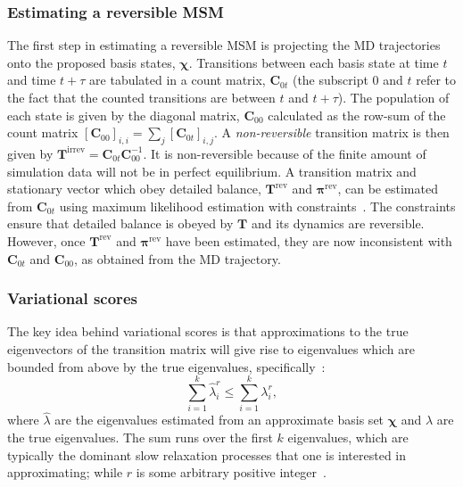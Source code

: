 \documentclass[journal=jacsat,manuscript=article]{achemso}
\begin{document}
\subsubsection{Estimating a reversible MSM}

The first step in estimating a reversible MSM is projecting the MD trajectories onto the proposed basis states, $\bm{\chi}$. Transitions between each basis state at time $t$ and time $t + \tau$ are tabulated in a count matrix, $\mathbf{C}_{0t}$ (the subscript $0$ and $t$ refer to the fact that the counted transitions are between $t$ and $t+\tau$).
The population of each state is given by the diagonal matrix, $\mathbf{C}_{00}$ calculated as the row-sum of the count matrix $[\mathbf{C}_{00}]_{i, i} = \sum_j [\mathbf{C}_{0t}]_{i, j}$.  A \emph{non-reversible} transition matrix is then given by $\mathbf{T}^{\mathrm{irrev}} = \mathbf{C}_{0t}\mathbf{C}_{00}^{-1}$. It is non-reversible because of the finite amount of simulation data will not be in perfect equilibrium. A transition matrix and stationary vector which obey detailed balance, $\mathbf{T}^{\mathrm{rev}}$ and $\bm{\pi}^{\mathrm{rev}}$, can be estimated from $\mathbf{C}_{0t}$ using maximum likelihood estimation with constraints~\cite{trendelkamp-schroer_estimation_2015}. The constraints ensure that detailed balance is obeyed by $\mathbf{T}$ and its dynamics are reversible.  However, once $\mathbf{T}^{\mathrm{rev}}$ and $\bm{\pi}^{\mathrm{rev}}$ have been estimated, they are now inconsistent with $\mathbf{C}_{0t}$ and $\mathbf{C}_{00}$, as obtained from the MD trajectory.

\subsubsection{Variational scores}

The key idea behind variational scores is that approximations to the true eigenvectors of the transition matrix will give rise to eigenvalues which are bounded from above by the true eigenvalues, specifically~\cite{mcgibbonVariationalCrossvalidationSlow2015, wuVariationalApproachLearning2020c}: 
\begin{equation}\label{eqn:var_principle}
    \sum_{i=1}^{k}\hat{\lambda}_{i}^{r} \leq \sum_{i=1}^{k}\lambda_{i}^{r},
\end{equation}
where $\hat{\lambda}$ are the eigenvalues estimated from an approximate basis set $\bm{\chi}$ and $\lambda$ are the true eigenvalues. The sum runs over the first $k$ eigenvalues, which are typically the dominant slow relaxation processes that one is interested in approximating; while $r$ is some arbitrary positive integer~\cite{wuVariationalApproachLearning2020c}.
\end{document}
